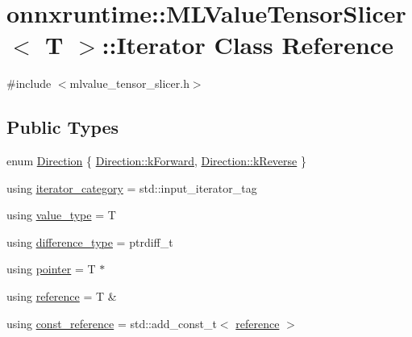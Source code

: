 \hypertarget{classonnxruntime_1_1MLValueTensorSlicer_1_1Iterator}{}\section{onnxruntime\+:\+:M\+L\+Value\+Tensor\+Slicer$<$ T $>$\+:\+:Iterator Class Reference}
\label{classonnxruntime_1_1MLValueTensorSlicer_1_1Iterator}


{\ttfamily \#include $<$mlvalue\+\_\+tensor\+\_\+slicer.\+h$>$}

\subsection*{Public Types}
\begin{DoxyCompactItemize}
\item 
enum \mbox{\hyperlink{classonnxruntime_1_1MLValueTensorSlicer_1_1Iterator_ad83ea2768d16fdaead62f58e6190a0c1}{Direction}} \{ \mbox{\hyperlink{classonnxruntime_1_1MLValueTensorSlicer_1_1Iterator_ad83ea2768d16fdaead62f58e6190a0c1ae7c3602dce09c755e09250077a601a51}{Direction\+::k\+Forward}}, 
\mbox{\hyperlink{classonnxruntime_1_1MLValueTensorSlicer_1_1Iterator_ad83ea2768d16fdaead62f58e6190a0c1abec8e974f160af3e10611c35be7972be}{Direction\+::k\+Reverse}}
 \}
\item 
using \mbox{\hyperlink{classonnxruntime_1_1MLValueTensorSlicer_1_1Iterator_abb629695163b5a562a4de32b77f88d64}{iterator\+\_\+category}} = std\+::input\+\_\+iterator\+\_\+tag
\item 
using \mbox{\hyperlink{classonnxruntime_1_1MLValueTensorSlicer_1_1Iterator_ad17283e0490333d5f34e50ba7c83c279}{value\+\_\+type}} = T
\item 
using \mbox{\hyperlink{classonnxruntime_1_1MLValueTensorSlicer_1_1Iterator_a927741252788936cc33b0c46e86ad646}{difference\+\_\+type}} = ptrdiff\+\_\+t
\item 
using \mbox{\hyperlink{classonnxruntime_1_1MLValueTensorSlicer_1_1Iterator_a74772736a244aaa7c9b7ae9dd9c1c83b}{pointer}} = T $\ast$
\item 
using \mbox{\hyperlink{classonnxruntime_1_1MLValueTensorSlicer_1_1Iterator_a528f0b8364b23168f0565c1503b44cd0}{reference}} = T \&
\item 
using \mbox{\hyperlink{classonnxruntime_1_1MLValueTensorSlicer_1_1Iterator_aafbb938cecd84d85c4eef5b9e4332873}{const\+\_\+reference}} = std\+::add\+\_\+const\+\_\+t$<$ \mbox{\hyperlink{classonnxruntime_1_1MLValueTensorSlicer_1_1Iterator_a528f0b8364b23168f0565c1503b44cd0}{reference}} $>$
\end{DoxyCompactItemize}
